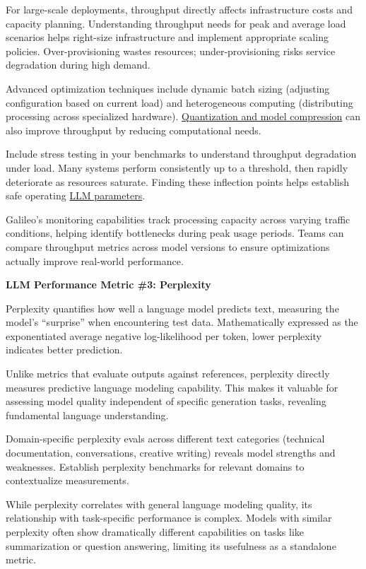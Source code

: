 \documentclass[
  letterpaper,
  DIV=11,
  numbers=noendperiod,
  oneside]{scrreprt}
\begin{document}
\begin{tcolorbox}
For large-scale deployments, throughput directly affects infrastructure
costs and capacity planning. Understanding throughput needs for peak and
average load scenarios helps right-size infrastructure and implement
appropriate scaling policies. Over-provisioning wastes resources;
under-provisioning risks service degradation during high demand.

Advanced optimization techniques include dynamic batch sizing (adjusting
configuration based on current load) and heterogeneous computing
(distributing processing across specialized hardware).
\href{https://medium.com/@bnjmn_marie/compression-techniques-for-llms-4eba6a6e622c}{Quantization
and model compression} can also improve throughput by reducing
computational needs.

Include stress testing in your benchmarks to understand throughput
degradation under load. Many systems perform consistently up to a
threshold, then rapidly deteriorate as resources saturate. Finding these
inflection points helps establish safe operating
\href{https://www.galileo.ai/blog/llm-parameters-model-evaluation}{LLM
parameters}.

Galileo's monitoring capabilities track processing capacity across
varying traffic conditions, helping identify bottlenecks during peak
usage periods. Teams can compare throughput metrics across model
versions to ensure optimizations actually improve real-world
performance.

\textbf{LLM Performance Metric \#3: Perplexity}

Perplexity quantifies how well a language model predicts text, measuring
the model's ``surprise'' when encountering test data. Mathematically
expressed as the exponentiated average negative log-likelihood per
token, lower perplexity indicates better prediction.

Unlike metrics that evaluate outputs against references, perplexity
directly measures predictive language modeling capability. This makes it
valuable for assessing model quality independent of specific generation
tasks, revealing fundamental language understanding.

Domain-specific perplexity evals across different text categories
(technical documentation, conversations, creative writing) reveals model
strengths and weaknesses. Establish perplexity benchmarks for relevant
domains to contextualize measurements.

While perplexity correlates with general language modeling quality, its
relationship with task-specific performance is complex. Models with
similar perplexity often show dramatically different capabilities on
tasks like summarization or question answering, limiting its usefulness
as a standalone metric.


\end{tcolorbox}
\end{document}
